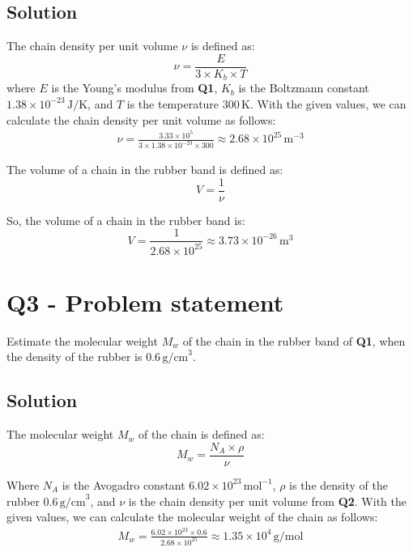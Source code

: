 \documentclass{article}
\begin{document}
\subsection*{Solution}
The chain density per unit volume $\nu$ is defined as:
\begin{equation}
  \nu = \frac{E}{3 \times K_b \times T}
\end{equation}
where $E$ is the Young's modulus from \textbf{Q1}, $K_b$ is the Boltzmann constant $1.38 \times 10^{-23} \, \mathrm{J/K}$,
and $T$ is the temperature $300 \, \mathrm{K}$.
With the given values, we can calculate the chain density per unit volume as follows:
\begin{equation}
  \begin{gathered}
  \nu = \frac{3.33 \times 10^5}{3 \times 1.38 \times 10^{-23} \times 300} \approx 2.68 \times 10^{25} \, \mathrm{m}^{-3}
  \end{gathered}
\end{equation}

The volume of a chain in the rubber band is defined as:
\begin{equation}
  V = \frac{1}{\nu}
\end{equation}

So, the volume of a chain in the rubber band is:
\begin{equation}
  V = \frac{1}{2.68 \times 10^{25}} \approx 3.73 \times 10^{-26} \, \mathrm{m}^3
\end{equation}

\newpage

\section*{Q3 - Problem statement}
Estimate the molecular weight $M_w$ of the chain in the rubber band of \textbf{Q1},
when the density of the rubber is $0.6 \, \mathrm{g/cm}^3$.
\subsection*{Solution}

The molecular weight $M_w$ of the chain is defined as:
\begin{equation}
  M_w = \frac{N_A \times \rho}{\nu}
\end{equation}

Where $N_A$ is the Avogadro constant $6.02 \times 10^{23} \, \mathrm{mol}^{-1}$,
$\rho$ is the density of the rubber $0.6 \, \mathrm{g/cm}^3$, 
and $\nu$ is the chain density per unit volume from \textbf{Q2}.
With the given values, we can calculate the molecular weight of the chain as follows:
\begin{equation}
  \begin{gathered}
  M_w = \frac{6.02 \times 10^{23} \times 0.6}{2.68 \times 10^{25}} \approx 1.35 \times 10^4 \, \mathrm{g/mol}
  \end{gathered}
\end{equation}
\end{document}
